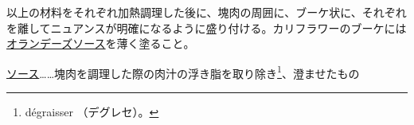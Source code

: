 \begin{recette}
以上の材料をそれぞれ加熱調理した後に、塊肉の周囲に、ブーケ状に、それぞれを離してニュアンスが明確になるように盛り付ける。カリフラワーのブーケには\protect\hyperlink{sauce-hollandaise}{オランデーズソース}を薄く塗ること。

\ul{ソース}\ldots{}\ldots{}塊肉を調理した際の肉汁の浮き脂を取り除き\footnote{dégraisser
  （デグレセ）。}、澄ませたもの
\end{recette}